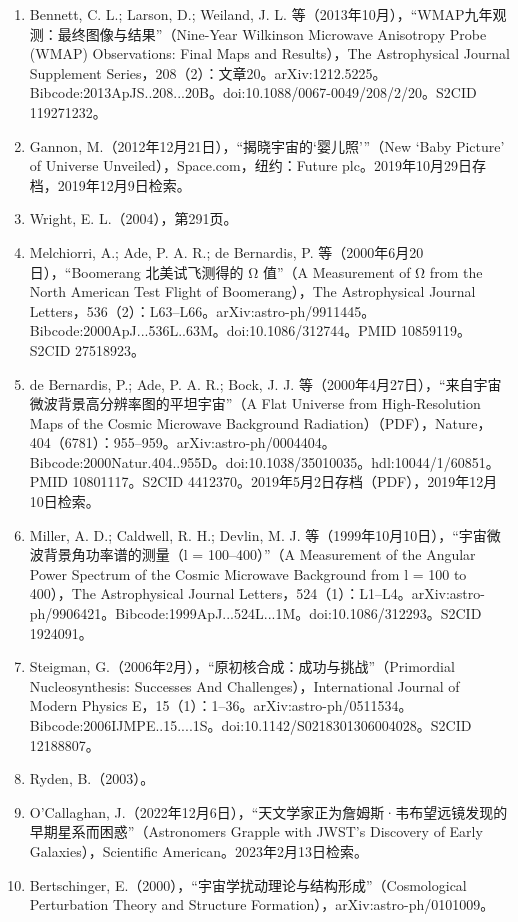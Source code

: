 \begin{enumerate}
\item Bennett, C. L.; Larson, D.; Weiland, J. L. 等（2013年10月），“WMAP九年观测：最终图像与结果”（Nine-Year Wilkinson Microwave Anisotropy Probe (WMAP) Observations: Final Maps and Results），The Astrophysical Journal Supplement Series，208（2）：文章20。arXiv:1212.5225。Bibcode:2013ApJS..208...20B。doi:10.1088/0067-0049/208/2/20。S2CID 119271232。  
\item Gannon, M.（2012年12月21日），“揭晓宇宙的‘婴儿照’”（New ‘Baby Picture’ of Universe Unveiled），Space.com，纽约：Future plc。2019年10月29日存档，2019年12月9日检索。  
\item Wright, E. L.（2004），第291页。  
\item Melchiorri, A.; Ade, P. A. R.; de Bernardis, P. 等（2000年6月20日），“Boomerang 北美试飞测得的 Ω 值”（A Measurement of Ω from the North American Test Flight of Boomerang），The Astrophysical Journal Letters，536（2）：L63–L66。arXiv:astro-ph/9911445。Bibcode:2000ApJ...536L..63M。doi:10.1086/312744。PMID 10859119。S2CID 27518923。  
\item de Bernardis, P.; Ade, P. A. R.; Bock, J. J. 等（2000年4月27日），“来自宇宙微波背景高分辨率图的平坦宇宙”（A Flat Universe from High-Resolution Maps of the Cosmic Microwave Background Radiation）（PDF），Nature，404（6781）：955–959。arXiv:astro-ph/0004404。Bibcode:2000Natur.404..955D。doi:10.1038/35010035。hdl:10044/1/60851。PMID 10801117。S2CID 4412370。2019年5月2日存档（PDF），2019年12月10日检索。  
\item Miller, A. D.; Caldwell, R. H.; Devlin, M. J. 等（1999年10月10日），“宇宙微波背景角功率谱的测量（l = 100–400）”（A Measurement of the Angular Power Spectrum of the Cosmic Microwave Background from l = 100 to 400），The Astrophysical Journal Letters，524（1）：L1–L4。arXiv:astro-ph/9906421。Bibcode:1999ApJ...524L...1M。doi:10.1086/312293。S2CID 1924091。  
\item Steigman, G.（2006年2月），“原初核合成：成功与挑战”（Primordial Nucleosynthesis: Successes And Challenges），International Journal of Modern Physics E，15（1）：1–36。arXiv:astro-ph/0511534。Bibcode:2006IJMPE..15....1S。doi:10.1142/S0218301306004028。S2CID 12188807。  
\item Ryden, B.（2003）。  
\item O’Callaghan, J.（2022年12月6日），“天文学家正为詹姆斯·韦布望远镜发现的早期星系而困惑”（Astronomers Grapple with JWST’s Discovery of Early Galaxies），Scientific American。2023年2月13日检索。  
\item Bertschinger, E.（2000），“宇宙学扰动理论与结构形成”（Cosmological Perturbation Theory and Structure Formation），arXiv:astro-ph/0101009。  

\end{enumerate}
